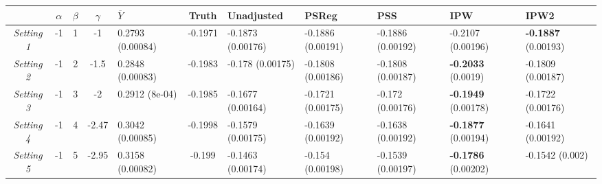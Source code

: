 \documentclass{article}
\begin{document}
	
	\begin{table}[H]
		\centering
		\begin{tabular}{ccccp{15mm}||cp{15mm}p{15mm}p{15mm}p{15mm}p{15mm}}
			\hline
			& $\alpha$ & $\beta$ & $\gamma$ & $\overline{Y}$ & Truth & Unadjusted & PSReg & PSS & IPW & IPW2 \\ \hline 
			\textsl{Setting 1} & -1 & 1 & -1 & 0.2793 \newline (0.00084) & -0.1971 & -0.1873 \newline (0.00176) & -0.1886 \newline (0.00191) & -0.1886 \newline (0.00192) & -0.2107 \newline (0.00196) & \textbf{-0.1887} \newline (0.00193) \\ 
			\textsl{Setting 2} & -1 & 2 & -1.5 & 0.2848 \newline (0.00083) & -0.1983 & -0.178 \newline (0.00175) & -0.1808 \newline (0.00186) & -0.1808 \newline (0.00187) & \textbf{-0.2033} \newline (0.0019) & -0.1809 \newline (0.00187) \\ 
			\textsl{Setting 3} & -1 & 3 & -2 & 0.2912 \newline (8e-04) & -0.1985 & -0.1677 \newline (0.00164) & -0.1721 \newline (0.00175) & -0.172 \newline (0.00176) & \textbf{-0.1949} \newline (0.00178) & -0.1722 \newline (0.00176) \\ 
			\textsl{Setting 4} & -1 & 4 & -2.47 & 0.3042 \newline (0.00085) & -0.1998 & -0.1579 \newline (0.00175) & -0.1639 \newline (0.00192) & -0.1638 \newline (0.00192) &\textbf{ -0.1877} \newline (0.00194) & -0.1641 \newline (0.00192) \\ 
			\textsl{Setting 5} & -1 & 5 & -2.95 & 0.3158 \newline (0.00082) & -0.199 & -0.1463 \newline (0.00174) & -0.154 \newline (0.00198) & -0.1539 \newline (0.00197) & \textbf{-0.1786} \newline (0.00202) & -0.1542 \newline (0.002) \\ 

\end{tabular}
\end{table}
\end{document}

